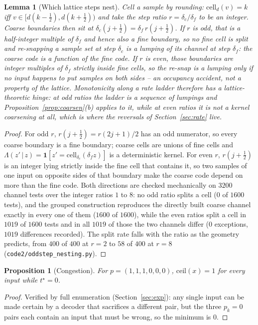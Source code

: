 \documentclass[11pt]{article}
\newtheorem{lemma}{Lemma}
\newtheorem{proposition}{Proposition}
\begin{document}
\begin{lemma}[Which lattice steps nest]\label{lem:oddstep}
Cell a sample by rounding: $\mathrm{cell}_{d}(v)=k$ iff $v\in[d(k-\tfrac12),d(k+\tfrac12))$
and take the step ratio $r=\delta_c/\delta_f$ to be an integer. Coarse boundaries then sit at
$\delta_c(j+\tfrac12)=\delta_f\,r(j+\tfrac12)$. If $r$ is odd, that is a half-integer multiple
of $\delta_f$ and hence also a fine boundary, so \emph{no} fine cell is split and re-snapping a
sample set at step $\delta_c$ is a lumping of its channel at step $\delta_f$: the coarse code is
a function of the fine code. If $r$ is even, those boundaries are integer multiples of $\delta_f$
strictly inside fine cells, so the re-snap is a lumping only if no input happens to put samples on
both sides -- an occupancy accident, not a property of the lattice. Monotonicity along a rate
ladder therefore has a lattice-theoretic hinge: at odd ratios the ladder is a sequence of lumpings
and Proposition~\ref{prop:coarsen}(b) applies to it, while at even ratios it is not a kernel
coarsening at all, which is where the reversals of Section~\ref{sec:rate} live.
\end{lemma}
\begin{proof}
For odd $r$, $r(j+\tfrac12)=r(2j+1)/2$ has an odd numerator, so every coarse boundary is a fine
boundary; coarse cells are unions of fine cells and
$\Lambda(z'\,|\,z)=\mathbf 1[z'=\mathrm{cell}_{\delta_c}(\delta_f z)]$
is a deterministic kernel. For even $r$, $r(j+\tfrac12)$ is an integer lying strictly inside the
fine cell that contains it, so two samples of one input on opposite sides of that boundary make
the coarse code depend on more than the fine code. Both directions are checked mechanically on $3200$ channel tests over the integer ratios $1$ to $8$: no odd ratio splits a cell ($0$ of $1600$ tests), and the grouped construction reproduces the directly built coarse channel exactly in every one of them ($1600$ of $1600$), while the even ratios split a cell in $1019$ of $1600$ tests and in all $1019$ of those the two channels differ ($0$ exceptions, $1019$ differences recorded). The split rate falls with the ratio as the geometry predicts, from $400$ of $400$ at $r=2$ to $58$ of $400$ at $r=8$ (\texttt{code2/oddstep\_nesting.py}).
\end{proof}

\begin{proposition}[Congestion]\label{prop:congest}
For $p=(1,1,1,0,0,0)$, $\mathrm{ceil}(x)=1$ for every input while $t^\star=0$.
\end{proposition}
\begin{proof}
Verified by full enumeration (Section~\ref{sec:exp}): any single input can be made certain by a
decoder that sacrifices a different pair, but the three $p_k=0$ pairs each contain an input that
must be wrong, so the minimum is $0$.
\end{proof}
\end{document}
